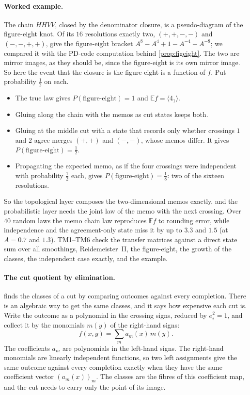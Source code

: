 \documentclass[11pt]{article}
\theoremstyle{definition}\newtheorem{definition}[theorem]{Definition}\newtheorem{remark}[theorem]{Remark}\newtheorem{example}[theorem]{Example}\newtheorem{problem}[theorem]{Open problem}\crefname{problem}{Problem}{Problems}
\begin{document}
\paragraph{Worked example.} The chain $HHVV$, closed by the denominator closure, is a pseudo-diagram of the figure-eight knot. Of its $16$ resolutions exactly two, $(+,+,-,-)$ and $(-,-,+,+)$, give the figure-eight bracket $A^8-A^4+1-A^{-4}+A^{-8}$; we compared it with the PD-code computation behind \cref{prop:figeight}. The two are mirror images, as they should be, since the figure-eight is its own mirror image. So here the event that the closure is the figure-eight is a function of $f$. Put probability $\tfrac12$ on each.
\begin{itemize}
\item The true law gives $P(\text{figure-eight})=1$ and $\mathbb E f=\langle 4_1\rangle$.
\item Gluing along the chain with the memos as cut states keeps both.
\item Gluing at the middle cut with a state that records only whether crossings $1$ and $2$ agree merges $(+,+)$ and $(-,-)$, whose memos differ. It gives $P(\text{figure-eight})=\tfrac12$.
\item Propagating the expected memo, as if the four crossings were independent with probability $\tfrac12$ each, gives $P(\text{figure-eight})=\tfrac18$: two of the sixteen resolutions.
\end{itemize}
So the topological layer composes the two-dimensional memos exactly, and the probabilistic layer needs the joint law of the memo with the next crossing. Over $40$ random laws the memo chain law reproduces $\mathbb E f$ to rounding error, while independence and the agreement-only state miss it by up to $3.3$ and $1.5$ (at $A=0.7$ and $1.3$). TM1--TM6 check the transfer matrices against a direct state sum over all smoothings, Reidemeister~II, the figure-eight, the growth of the classes, the independent case exactly, and the example.


\paragraph{The cut quotient by elimination.}  finds the classes of a cut by comparing outcomes against every completion. There is an algebraic way to get the same classes, and it says how expensive each cut is. Write the outcome as a polynomial in the crossing signs, reduced by $e_i^2=1$, and collect it by the monomials $m(y)$ of the right-hand signs:
\[
f(x,y)=\sum_m a_m(x)\,m(y).
\]
The coefficients $a_m$ are polynomials in the left-hand signs. The right-hand monomials are linearly independent functions, so two left assignments give the same outcome against every completion exactly when they have the same coefficient vector $(a_m(x))_m$. The classes are the fibres of this coefficient map, and the cut needs to carry only the point of its image.
\end{document}
